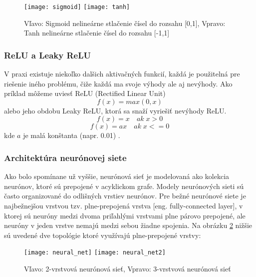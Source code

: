 \begin{figure}[H]
    \centering
    \texttt{[image: sigmoid]}
    \qquad
    \texttt{[image: tanh]}
    \caption{
        Vľavo: Sigmoid nelineárne stlačenie čísel do rozsahu [0,1],
        Vpravo: Tanh nelineárne stlačenie čísel do rozsahu [-1,1] \cite{odkaz:ConvolutionalNeuralNetworkCS231n}
    }
    \label{pic:ActivationFunctions}
\end{figure}

\subsubsection{ReLU a Leaky ReLU}
V praxi existuje niekoľko dalšich aktivačných funkcií, každá je použitelná pre riešenie iného problému,
    čiže každá ma svoje výhody ale aj nevýhody.
Ako príklad môžeme uviesť ReLU (Rectified Linear Unit)
\begin{equation}
    f(x) = max(0,x)
\end{equation}
alebo jeho obdobu Leaky ReLU, ktorá sa snaží vyriešiť nevýhody ReLU.
\begin{equation}
    f(x) = x \quad ak \; x > 0
\end{equation}
\begin{equation}
    f(x) = ax \quad ak \; x <= 0
\end{equation}
kde $a$ je malá konštanta (napr. 0.01) \cite{odkaz:ConvolutionalNeuralNetworkCS231n}.

\subsubsection{Architektúra neurónovej siete}
Ako bolo spomínane už vyššie, neurónová sieť je modelovaná ako kolekcia neurónov, ktoré sú prepojené v acyklickom grafe.
Modely neurónových sieti sú často organizované do odlišných vrstiev neurónov.
Pre bežné neurónové siete je najbežnejšou vrstvou tzv. plne-prepojená vrstva [eng. fully-connected layer],
    v ktorej sú neuróny medzi dvoma priľahlými vrstvami plne párovo prepojené, ale neuróny v jeden vrstve nemajú medzi sebou žiadne spojenia.
Na obrázku \ref{pic:NeuralNetworkArchitecture} nižšie sú uvedené dve topológie ktoré využívajú plne-prepojené vrstvy\cite{odkaz:ConvolutionalNeuralNetworkCS231n}:
\begin{figure}[H]
    \centering
    \texttt{[image: neural\_net]}
    \qquad
    \texttt{[image: neural\_net2]}
    \caption{Vľavo: 2-vrstvová neurónová sieť, Vpravo: 3-vrstvová neurónová sieť \cite{odkaz:ConvolutionalNeuralNetworkCS231n}}
    \label{pic:NeuralNetworkArchitecture}
\end{figure}

